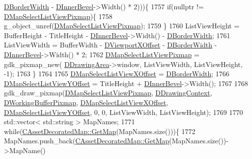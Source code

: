 \begin{DoxyCode}
      \hyperlink{classCApplicationData_a566b69c72fa982c6ecf8e47dc21df489}{DBorderWidth} - \hyperlink{classCApplicationData_a29a687c44dceb9e87a56d96612d59ab5}{DInnerBevel}->Width() * 2)))\{
1757         \textcolor{keywordflow}{if}(\textcolor{keyword}{nullptr} != \hyperlink{classCApplicationData_a76e4af228d69ca3c6b1cf0770ca2e7a0}{DMapSelectListViewPixmap})\{
1758             g\_object\_unref(\hyperlink{classCApplicationData_a76e4af228d69ca3c6b1cf0770ca2e7a0}{DMapSelectListViewPixmap});
1759         \}
1760         ListViewHeight = BufferHeight - TitleHeight - \hyperlink{classCApplicationData_a29a687c44dceb9e87a56d96612d59ab5}{DInnerBevel}->Width() - 
      \hyperlink{classCApplicationData_a566b69c72fa982c6ecf8e47dc21df489}{DBorderWidth};
1761         ListViewWidth = BufferWidth - \hyperlink{classCApplicationData_a306bba873ccc47126111305fe21ef3ff}{DViewportXOffset} - 
      \hyperlink{classCApplicationData_a566b69c72fa982c6ecf8e47dc21df489}{DBorderWidth} - \hyperlink{classCApplicationData_a29a687c44dceb9e87a56d96612d59ab5}{DInnerBevel}->Width() * 2;
1762         \hyperlink{classCApplicationData_a76e4af228d69ca3c6b1cf0770ca2e7a0}{DMapSelectListViewPixmap} = gdk\_pixmap\_new(
      \hyperlink{classCApplicationData_a4735f5d31632313e0b2a1659eb178987}{DDrawingArea}->window, ListViewWidth, ListViewHeight, -1);
1763     \}
1764     
1765     \hyperlink{classCApplicationData_aa5a89b442e384acdf1c2aefc7ce4233b}{DMapSelectListViewXOffset} = \hyperlink{classCApplicationData_a566b69c72fa982c6ecf8e47dc21df489}{DBorderWidth};
1766     \hyperlink{classCApplicationData_ae1a8eb3fff3cf5bc236564925bec1c8c}{DMapSelectListViewYOffset} = TitleHeight + 
      \hyperlink{classCApplicationData_a29a687c44dceb9e87a56d96612d59ab5}{DInnerBevel}->Width();
1767     
1768     gdk\_draw\_pixmap(\hyperlink{classCApplicationData_a76e4af228d69ca3c6b1cf0770ca2e7a0}{DMapSelectListViewPixmap}, 
      \hyperlink{classCApplicationData_aa6c5bea9bdcc64398e5a3f693661d37c}{DDrawingContext}, \hyperlink{classCApplicationData_afa34cf2780f38dd28c0c811e69d60a97}{DWorkingBufferPixmap}, 
      \hyperlink{classCApplicationData_aa5a89b442e384acdf1c2aefc7ce4233b}{DMapSelectListViewXOffset}, \hyperlink{classCApplicationData_ae1a8eb3fff3cf5bc236564925bec1c8c}{DMapSelectListViewYOffset}, 0, 
      0, ListViewWidth, ListViewHeight);
1769     
1770     std::vector< std::string > MapNames;       
1771     \textcolor{keywordflow}{while}(\hyperlink{classCAssetDecoratedMap_afafb067884070fe0340f8b7e63bdc099}{CAssetDecoratedMap::GetMap}(MapNames.size()))\{
1772         MapNames.push\_back(\hyperlink{classCAssetDecoratedMap_afafb067884070fe0340f8b7e63bdc099}{CAssetDecoratedMap::GetMap}(MapNames.size())->MapName()

\end{DoxyCode}
